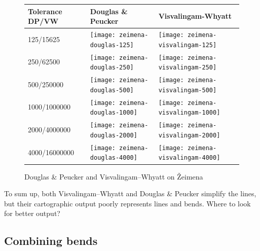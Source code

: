 \documentclass[a4paper]{article}
\newcommand{\DP}{Douglas \& Peucker}
\newcommand{\VW}{Visvalingam--Whyatt}
\begin{document}
\begin{figure}[h]
    \renewcommand{\tabularxcolumn}[1]{>{\center\small}m{#1}}
    \begin{tabularx}{\textwidth}{ p{2.1cm} | X | X | }
        Tolerance DP/VW                                                   &
        Douglas \& Peucker                                                &
        Visvalingam-Whyatt                                                \tabularnewline \hline

        125/15625                                                         &
        \texttt{[image: zeimena-douglas-125]}           &
        \texttt{[image: zeimena-visvalingam-125]}       \tabularnewline \hline

        250/62500                                                         &
        \texttt{[image: zeimena-douglas-250]}         &
        \texttt{[image: zeimena-visvalingam-250]}     \tabularnewline \hline

        500/250000                                                        &
        \texttt{[image: zeimena-douglas-500]}        &
        \texttt{[image: zeimena-visvalingam-500]}    \tabularnewline \hline

        1000/1000000                                                      &
        \texttt{[image: zeimena-douglas-1000]}      &
        \texttt{[image: zeimena-visvalingam-1000]}  \tabularnewline \hline

        2000/4000000                                                      &
        \texttt{[image: zeimena-douglas-2000]}     &
        \texttt{[image: zeimena-visvalingam-2000]} \tabularnewline \hline

        4000/16000000                                                     &
        \texttt{[image: zeimena-douglas-4000]}     &
        \texttt{[image: zeimena-visvalingam-4000]} \tabularnewline \hline
    \end{tabularx}
    \caption{{\DP} and {\VW} on Žeimena}
    \label{tab:comparison-zeimena}
\end{figure}


To sum up, both {\VW} and {\DP} simplify the lines, but their cartographic
output poorly represents lines and bends. Where to look for better output?

\subsection{Combining bends}
\end{document}
